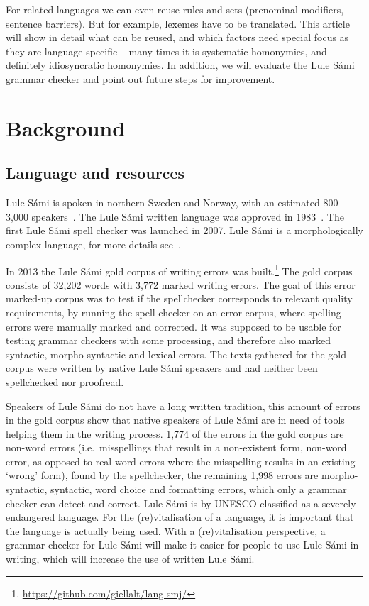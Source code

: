 \documentclass[free]{flammie}
\begin{document}
For related languages we can even reuse rules and sets (prenominal modifiers,
sentence barriers).  But for example, lexemes have to be translated.  This
article will show in detail what can be reused, and which factors need special
focus as they are language specific -- many times it is systematic homonymies,
and definitely idiosyncratic homonymies.  In addition, we will evaluate the Lule
Sámi grammar checker and point out future steps for improvement.

\section{Background}

\subsection{Language and resources}

Lule Sámi is spoken in northern Sweden and Norway, with an estimated 800--3,000
speakers~\cite{Sammallahti1998saami, Kuoljok2002barjas,
Svonni2008spraksituationen, Rydving2013words, moseley2010atlas}.  The Lule Sámi written
language was approved in 1983~\cite{Magga1994hvordan}.  The first Lule Sámi
spell checker was launched in 2007.  Lule Sámi is a morphologically complex
language, for more details see~\cite{Jussi2022}.

In 2013 the Lule Sámi gold corpus of writing errors was
built.\footnote{\url{https://github.com/giellalt/lang-smj/}} The gold corpus
consists of 32,202 words with 3,772 marked writing errors. The goal of this
error marked-up corpus was to test if the spellchecker corresponds to relevant
quality requirements, by running the spell checker on an error corpus, where
spelling errors were manually marked and corrected.  It was supposed to be
usable for testing grammar checkers with some processing, and therefore also
marked syntactic, morpho-syntactic and lexical errors. The texts gathered for
the gold corpus were written by native Lule Sámi speakers and had neither been
spellchecked nor proofread.

Speakers of Lule Sámi do not have a long written tradition, this amount of
errors in the gold corpus show that native speakers of Lule Sámi are in need of
tools helping them in the writing process. 1,774 of the errors in the gold
corpus are non-word errors (i.e.\ misspellings that result in a non-existent
form, non-word error, as opposed to real word errors where the misspelling
results in an existing `wrong' form), found by the spellchecker, the remaining
1,998 errors are morpho-syntactic, syntactic, word choice and formatting errors,
which only a grammar checker can detect and correct.  Lule Sámi is by UNESCO
classified as a severely endangered language.  For the (re)vitalisation of a
language, it is important that the language is actually being used. With a
(re)vitalisation perspective, a grammar checker for Lule Sámi will make it
easier for people to use Lule Sámi in writing, which will increase the use of
written Lule Sámi.
\end{document}
